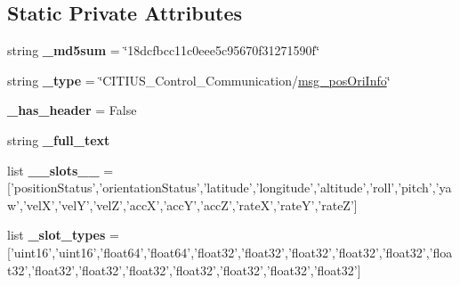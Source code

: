 \subsection*{\-Static \-Private \-Attributes}
\begin{DoxyCompactItemize}
\item 
\hypertarget{class_c_i_t_i_u_s___control___communication_1_1msg_1_1__msg__pos_ori_info_1_1msg__pos_ori_info_aad212233cfeb52712f02c83f18383930}{string {\bfseries \-\_\-md5sum} = \char`\"{}18dcfbcc11c0eee5c95670f31271590f\char`\"{}}\label{class_c_i_t_i_u_s___control___communication_1_1msg_1_1__msg__pos_ori_info_1_1msg__pos_ori_info_aad212233cfeb52712f02c83f18383930}

\item 
\hypertarget{class_c_i_t_i_u_s___control___communication_1_1msg_1_1__msg__pos_ori_info_1_1msg__pos_ori_info_ad361d1acf24010c4514072619ebf3651}{string {\bfseries \-\_\-type} = \char`\"{}\-C\-I\-T\-I\-U\-S\-\_\-\-Control\-\_\-\-Communication/\hyperlink{class_c_i_t_i_u_s___control___communication_1_1msg_1_1__msg__pos_ori_info_1_1msg__pos_ori_info}{msg\-\_\-pos\-Ori\-Info}\char`\"{}}\label{class_c_i_t_i_u_s___control___communication_1_1msg_1_1__msg__pos_ori_info_1_1msg__pos_ori_info_ad361d1acf24010c4514072619ebf3651}

\item 
\hypertarget{class_c_i_t_i_u_s___control___communication_1_1msg_1_1__msg__pos_ori_info_1_1msg__pos_ori_info_ae02715ea9b8022007704348af2adb77a}{{\bfseries \-\_\-has\-\_\-header} = \-False}\label{class_c_i_t_i_u_s___control___communication_1_1msg_1_1__msg__pos_ori_info_1_1msg__pos_ori_info_ae02715ea9b8022007704348af2adb77a}

\item 
string {\bfseries \-\_\-full\-\_\-text}
\item 
\hypertarget{class_c_i_t_i_u_s___control___communication_1_1msg_1_1__msg__pos_ori_info_1_1msg__pos_ori_info_a804536d7b77ef2d00f4e73b1dd311506}{list {\bfseries \-\_\-\-\_\-slots\-\_\-\-\_\-} = \mbox{[}'position\-Status','orientation\-Status','latitude','longitude','altitude','roll','pitch','yaw','vel\-X','vel\-Y','vel\-Z','acc\-X','acc\-Y','acc\-Z','rate\-X','rate\-Y','rate\-Z'\mbox{]}}\label{class_c_i_t_i_u_s___control___communication_1_1msg_1_1__msg__pos_ori_info_1_1msg__pos_ori_info_a804536d7b77ef2d00f4e73b1dd311506}

\item 
\hypertarget{class_c_i_t_i_u_s___control___communication_1_1msg_1_1__msg__pos_ori_info_1_1msg__pos_ori_info_a2e2ca2e29e7b7f472bffe4d3a7137d67}{list {\bfseries \-\_\-slot\-\_\-types} = \mbox{[}'uint16','uint16','float64','float64','float32','float32','float32','float32','float32','float32','float32','float32','float32','float32','float32','float32','float32'\mbox{]}}\label{class_c_i_t_i_u_s___control___communication_1_1msg_1_1__msg__pos_ori_info_1_1msg__pos_ori_info_a2e2ca2e29e7b7f472bffe4d3a7137d67}

\end{DoxyCompactItemize}



